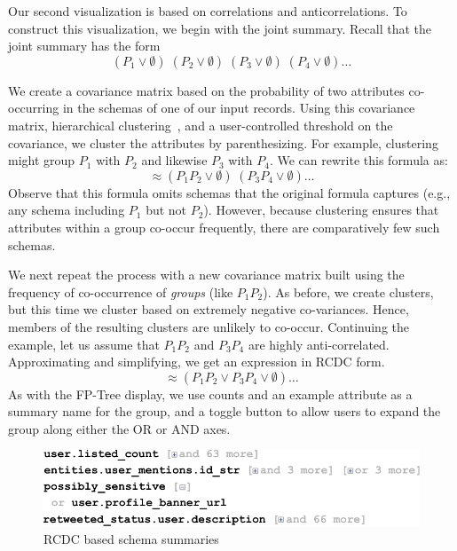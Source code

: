 Our second visualization is based on correlations and anticorrelations.
To construct this visualization, we begin with the joint summary.
Recall that the joint summary has the form 
$$(P_1 \vee \emptyset)\;(P_2 \vee \emptyset)\;(P_3 \vee \emptyset)\;(P_4 \vee \emptyset)\ldots$$

We create a covariance matrix based on the probability of two attributes co-occurring in the schemas of one of our input \json records.  
Using this covariance matrix, hierarchical clustering~\cite{Johnson1967}, and a user-controlled threshold on the covariance, we cluster the attributes by parenthesizing.  For example, clustering might group $P_1$ with $P_2$ and likewise $P_3$ with $P_4$.
We can rewrite this formula as:
$$\approx (P_1P_2 \vee \emptyset)\;(P_3P_4 \vee \emptyset)\ldots$$
Observe that this formula omits schemas that the original formula captures (e.g., any schema including $P_1$ but not $P_2$).
However, because clustering ensures that attributes within a group co-occur frequently, there are comparatively few such schemas.

We next repeat the process with a new covariance matrix built using the frequency of co-occurrence of \emph{groups} (like $P_1P_2$).  
As before, we create clusters, but this time we cluster based on extremely negative co-variances.
Hence, members of the resulting clusters are unlikely to co-occur.
Continuing the example, let us assume that $P_1P_2$ and $P_3P_4$ are highly anti-correlated.  
Approximating and simplifying, we get an expression in RCDC form.
$$\approx (P_1P_2 \vee P_3P_4 \vee \emptyset)\ldots$$
As with the FP-Tree display, we use counts and an example attribute as a summary name for the group, and a toggle button to allow users to expand the group along either the OR or AND axes.

\begin{figure}
\centering
\includegraphics[width=0.8\columnwidth]{SchemaSummarization/img/collapse-RCDC}
\caption{RCDC based schema summaries}
\label{fig:summary:rcdc}
\end{figure}




